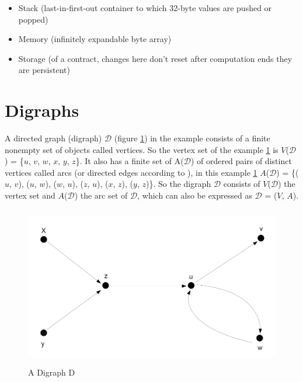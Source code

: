 \begin{itemize}
	\item Stack (last-in-first-out container to which 32-byte values are pushed or popped)
	\item Memory (infinitely expandable byte array)
	\item Storage (of a contract, changes here don't reset after computation ends they are persistent)
\end{itemize}


\clearpage


\section{Digraphs}
\label{sec:background:second_section}
A directed graph (digraph) $\mathcal{D}$ (figure \ref{fig:a_digraph_d}) in the example consists of a finite nonempty set of objects called vertices. So the vertex set of the example \ref{fig:a_digraph_d} is $V$($\mathcal{D}$) = \{$u$, $v$, $w$, $x$, $y$, $z$\}. It also has a finite set of A($\mathcal{D}$) of ordered pairs of distinct vertices called arcs (or directed edges according to \cite{chartrand2010graphs}), in this example \ref{fig:a_digraph_d} $A$($\mathcal{D}$) = \{($u$, $v$), ($u$, $w$), ($w$, $u$), ($z$, $u$), ($x$, $z$), ($y$, $z$)\}. So the digraph $\mathcal{D}$ consists of $V$($\mathcal{D}$) the vertex set and $A$($\mathcal{D}$) the arc set of $\mathcal{D}$, which can also be expressed as $\mathcal{D}$ = ($V$, $A$). \newline



\begin{figure}[h]
	\includegraphics[height=7cm]{adigraphd}	%
	\caption{A Digraph D}
	\label{fig:a_digraph_d}
\end{figure}


